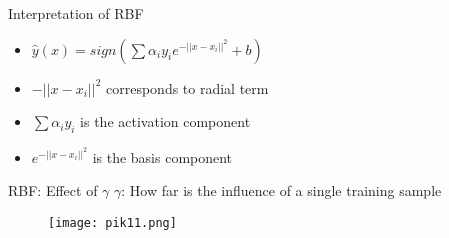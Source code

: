 \documentclass{beamer}
\begin{document}
	\begin{frame}{Interpretation of RBF}
		\begin{itemize}[<+->]
			\item $\hat{y}(x) = sign(\sum \alpha_{i}y_{i}e^{-\lvert\lvert x - x_{i} \rvert\rvert^{2}} + b)$
			\item ${-\lvert\lvert x - x_{i} \rvert\rvert^{2}}$ corresponds to radial term
			\item $\sum \alpha_{i}y_{i}$ is the activation component
			\item $e^{-\lvert\lvert x - x_{i} \rvert\rvert^{2}}$ is the basis component
		\end{itemize}
	    
	    
	\end{frame}
	\begin{frame}{RBF: Effect of $\gamma$}
	\vspace{2cm}
	    $\gamma$: How far is the influence of a single training sample \\
	    \vspace{-2cm}
	    \begin{minipage}{0.2\textwidth}
      \begin{figure}
      
       \texttt{[image: pik11.png]}
      \end{figure}
  \end{minipage} \\
	\end{frame}

	
\end{document}
